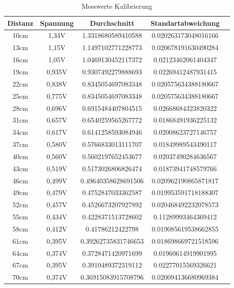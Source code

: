 \documentclass[12pt, oneside, a4paper, \docLanguage]{report}
\begin{document}
\begin{table}[H]
	\centering\small
	\begin{tabular}{|c|c|c|c|c|}
		\hline
		Distanz & Spannung &  Durchschnitt & Standartabweichung \\
		\hline
		10cm & 1,34V & 1.3318680589410588 & 0.020263173048016166 \\
		\hline
		13cm & 1,15V & 1.1497102771228773 & 0.020678191630490284 \\
		\hline
		16cm & 1,05V & 1.0469130452117372 & 0.02123462061404347 \\
		\hline
		19cm & 0,935V & 0.9307492279888693 & 0.02269412487931415 \\
		\hline
		22cm & 0,838V & 0.8345054697083348 & 0.020575634388180667 \\
		\hline
		25cm & 0,775V & 0.8345054697083348 & 0.020575634388180667 \\
		\hline
		28cm & 0,696V & 0.6915484407804515 & 0.02668684323820322 \\
		\hline
		31cm & 0,657V & 0.6540259565267772 & 0.01868491936225132 \\
		\hline
		34cm & 0,617V & 0.6141258593084946 & 0.02008623727146757 \\
		\hline
		37cm & 0,580V & 0.5766833013111707 & 0.01849989543490117 \\
		\hline
		40cm & 0,560V & 0.5602197652453677 & 0.02037490284636567 \\
		\hline
		43cm & 0,519V & 0.5173026806826474 & 0.01873941748579766 \\
		\hline
		46cm & 0,499V & 0.49640358628691506 & 0.020962190865871817 \\
		\hline
		49cm & 0,479V & 0.4752847033362587 & 0.019953591718188307 \\
		\hline
		52cm & 0,457V & 0.4526673207927892 & 0.020468492232078573 \\
		\hline
		55cm & 0,434V & 0.4228371513728602 & 0.11289993464369412 \\
		\hline
		58cm & 0,412V & 0.41786212422798 & 0.019085619538662855 \\
		\hline
		61cm & 0,395V & 0.39262735831746653 & 0.018698669721518596 \\
		\hline
		64cm & 0,374V & 0.3728471420971699 & 0.01960614919901995 \\
		\hline
		67cm & 0,395V & 0.3910489372319112 & 0.02277015569326621 \\
		\hline
		70cm & 0,374V & 0.36915083915708796 & 0.020094136680969384 \\
		\hline
	\end{tabular}
	\caption{Messwerte Kalibrierung}
	\label{fig:VERSUCH_1_MESSWERTE_TABELLE}
\end{table}
\end{document}
